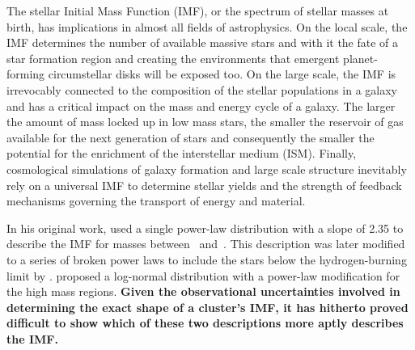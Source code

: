 The stellar Initial Mass Function (IMF), or the spectrum of stellar masses at birth, has implications in almost all fields of astrophysics. On the local scale, the IMF determines the number of available massive stars and with it the fate of a star formation region and creating the environments that emergent planet-forming circumstellar disks will be exposed too. 
On the large scale, the IMF is irrevocably connected to the composition of the stellar populations in a galaxy and has a critical impact on the mass and energy cycle of a galaxy. The larger the amount of mass locked up in low mass stars, the smaller the reservoir of gas available for the next generation of stars and consequently the smaller the potential for the enrichment of the interstellar medium (ISM). Finally, cosmological simulations of galaxy formation and large scale structure inevitably rely on a universal IMF to determine stellar yields and the strength of feedback mechanisms governing the transport of energy and material. 


In his original work, \citet{salpeter1955} used a single power-law distribution with a slope of 2.35 to describe the IMF for masses between \ and \,\msun . This description was later modified to a series of broken power laws to include the stars below the hydrogen-burning limit by \citet{kroupa2001}. \citet{chabrier2003, Chabrier2005} proposed a log-normal distribution with a power-law modification for the high mass regions. 
\textbf{Given the observational uncertainties involved in determining the exact shape of a cluster's IMF, it has hitherto proved difficult to show which of these two descriptions more aptly describes the IMF.}

